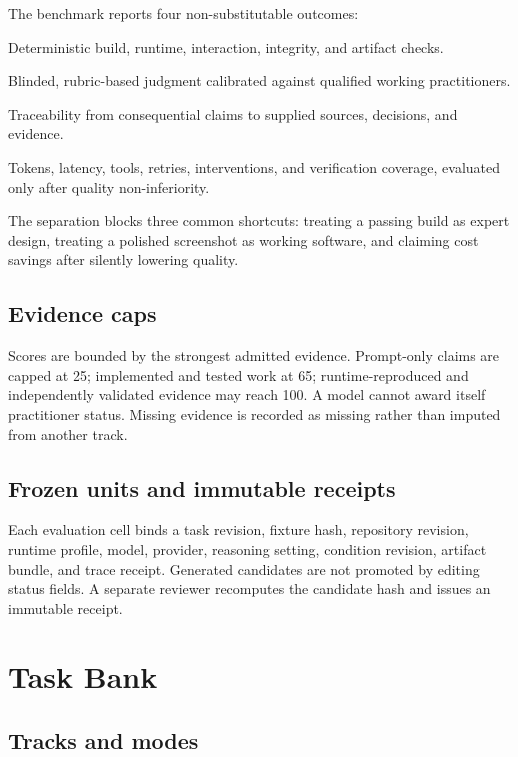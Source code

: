 \documentclass[10pt,twocolumn]{article}
\begin{document}
The benchmark reports four non-substitutable outcomes:

\begin{description}[style=nextline]
  \item[Acceptance.] Deterministic build, runtime, interaction, integrity, and
  artifact checks.
  \item[Professional quality.] Blinded, rubric-based judgment calibrated
  against qualified working practitioners.
  \item[Source trust.] Traceability from consequential claims to supplied
  sources, decisions, and evidence.
  \item[Efficiency.] Tokens, latency, tools, retries, interventions, and
  verification coverage, evaluated only after quality non-inferiority.
\end{description}

The separation blocks three common shortcuts: treating a passing build as
expert design, treating a polished screenshot as working software, and
claiming cost savings after silently lowering quality.

\subsection{Evidence caps}

Scores are bounded by the strongest admitted evidence. Prompt-only claims are
capped at 25; implemented and tested work at 65; runtime-reproduced and
independently validated evidence may reach 100. A model cannot award itself
practitioner status. Missing evidence is recorded as missing rather than
imputed from another track.

\subsection{Frozen units and immutable receipts}

Each evaluation cell binds a task revision, fixture hash, repository revision,
runtime profile, model, provider, reasoning setting, condition revision,
artifact bundle, and trace receipt. Generated candidates are not promoted by
editing status fields. A separate reviewer recomputes the candidate hash and
issues an immutable receipt.

\section{Task Bank}

\subsection{Tracks and modes}
\end{document}
